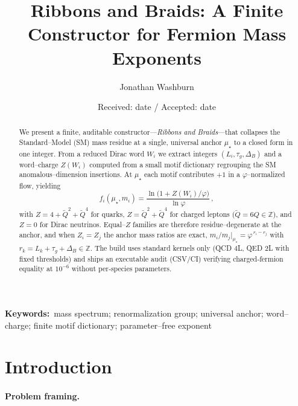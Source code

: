 \documentclass[epjc3]{svjour3}
\title{Ribbons and Braids: A Finite Constructor for Fermion Mass Exponents}
\author{Jonathan Washburn}
\institute{Recognition Science, Recognition Physics Institute, Austin, Texas, USA \\\email{jon@recognitionphysics.org}}
\date{Received: date / Accepted: date}
\newcommand{\keywords}[1]{\par\smallskip\noindent\textbf{Keywords:}~#1\par}
\begin{document}
\maketitle

\begin{abstract}
We present a finite, auditable constructor---\emph{Ribbons and Braids}---that collapses the Standard–Model (SM) mass residue at a single, universal anchor $\mu_\star$ to a closed form in one integer. From a reduced Dirac word $W_i$ we extract integers $(L_i,\tau_g,\Delta_B)$ and a word–charge $Z(W_i)$ computed from a small motif dictionary regrouping the SM anomalous–dimension insertions. At $\mu_\star$ each motif contributes $+1$ in a $\varphi$–normalized flow, yielding
\[
f_i(\mu_\star,m_i)=\frac{\ln\!\bigl(1+Z(W_i)/\varphi\bigr)}{\ln\varphi}\,,
\]
with $Z=4+\tilde Q^2+\tilde Q^4$ for quarks, $Z=\tilde Q^2+\tilde Q^4$ for charged leptons ($\tilde Q=6Q\in\mathbb Z$), and $Z=0$ for Dirac neutrinos. Equal–$Z$ families are therefore residue–degenerate at the anchor, and when $Z_i=Z_j$ the anchor mass ratios are exact, $m_i/m_j|_{\mu_\star}=\varphi^{\,r_i-r_j}$ with $r_k=L_k+\tau_g+\Delta_B\in\mathbb Z$. The build uses standard kernels only (QCD 4L, QED 2L with fixed thresholds) and ships an executable audit (CSV/CI) verifying charged‑fermion equality at $10^{-6}$ without per‑species parameters.
\end{abstract}

\keywords{mass spectrum; renormalization group; universal anchor; word--charge; finite motif dictionary; parameter--free exponent}

\section{Introduction}

\paragraph{Problem framing.}
\end{document}
